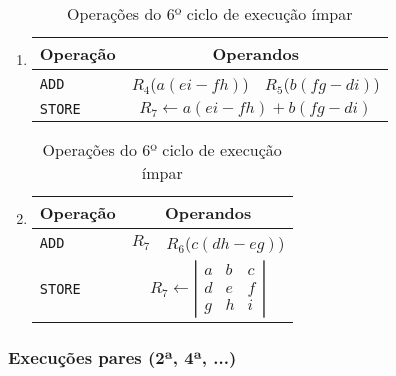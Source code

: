 \begin{enumerate}
\item %

\begin{table}[H]
\centering
\begin{tabular}{l|c|c}
Operação & \multicolumn{2}{c}{Operandos} \\
\hline
\texttt{ADD} & $R_4$($a(ei - fh)$) & $R_5$($b(fg - di)$) \\
\hline
\texttt{STORE} &\multicolumn{2}{c}{$R_7\leftarrow a(ei - fh) + b(fg - di)$} \\
\end{tabular}
\caption{Operações do 6º ciclo de execução ímpar}
\label{tab:odd_6}
\end{table}

\item %

\begin{table}[H]
\centering
\begin{tabular}{l|c|c}
Operação & \multicolumn{2}{c}{Operandos} \\
\hline
\texttt{ADD} & $R_7$ & $R_6$($c(dh - eg)$) \\
\hline
\texttt{STORE} &\multicolumn{2}{c}{$R_7\leftarrow \left|\begin{matrix}a&b&c\\d&e&f\\g&h&i\end{matrix}\right|$} \\
\end{tabular}
\caption{Operações do 6º ciclo de execução ímpar}
\label{tab:odd_6}
\end{table}

\end{enumerate}

\subsubsection{Execuções pares (2ª, 4ª, ...)}